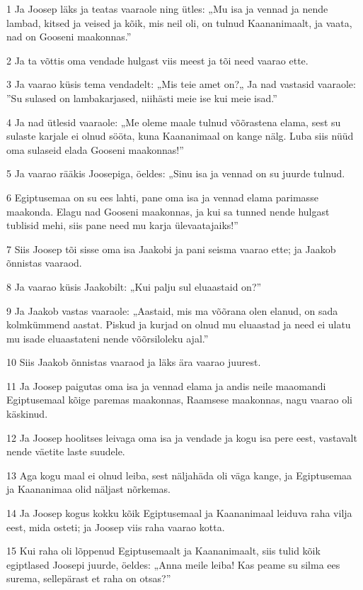 \par 1 Ja Joosep läks ja teatas vaaraole ning ütles: „Mu isa ja vennad ja nende lambad, kitsed ja veised ja kõik, mis neil oli, on tulnud Kaananimaalt, ja vaata, nad on Gooseni maakonnas.”
\par 2 Ja ta võttis oma vendade hulgast viis meest ja tõi need vaarao ette.
\par 3 Ja vaarao küsis tema vendadelt: „Mis teie amet on?„ Ja nad vastasid vaaraole: ”Su sulased on lambakarjased, niihästi meie ise kui meie isad.”
\par 4 Ja nad ütlesid vaaraole: „Me oleme maale tulnud võõrastena elama, sest su sulaste karjale ei olnud sööta, kuna Kaananimaal on kange nälg. Luba siis nüüd oma sulaseid elada Gooseni maakonnas!”
\par 5 Ja vaarao rääkis Joosepiga, öeldes: „Sinu isa ja vennad on su juurde tulnud.
\par 6 Egiptusemaa on su ees lahti, pane oma isa ja vennad elama parimasse maakonda. Elagu nad Gooseni maakonnas, ja kui sa tunned nende hulgast tublisid mehi, siis pane need mu karja ülevaatajaiks!”
\par 7 Siis Joosep tõi sisse oma isa Jaakobi ja pani seisma vaarao ette; ja Jaakob õnnistas vaaraod.
\par 8 Ja vaarao küsis Jaakobilt: „Kui palju sul eluaastaid on?”
\par 9 Ja Jaakob vastas vaaraole: „Aastaid, mis ma võõrana olen elanud, on sada kolmkümmend aastat. Piskud ja kurjad on olnud mu eluaastad ja need ei ulatu mu isade eluaastateni nende võõrsiloleku ajal.”
\par 10 Siis Jaakob õnnistas vaaraod ja läks ära vaarao juurest.
\par 11 Ja Joosep paigutas oma isa ja vennad elama ja andis neile maaomandi Egiptusemaal kõige paremas maakonnas, Raamsese maakonnas, nagu vaarao oli käskinud.
\par 12 Ja Joosep hoolitses leivaga oma isa ja vendade ja kogu isa pere eest, vastavalt nende väetite laste suudele.
\par 13 Aga kogu maal ei olnud leiba, sest näljahäda oli väga kange, ja Egiptusemaa ja Kaananimaa olid näljast nõrkemas.
\par 14 Ja Joosep kogus kokku kõik Egiptusemaal ja Kaananimaal leiduva raha vilja eest, mida osteti; ja Joosep viis raha vaarao kotta.
\par 15 Kui raha oli lõppenud Egiptusemaalt ja Kaananimaalt, siis tulid kõik egiptlased Joosepi juurde, öeldes: „Anna meile leiba! Kas peame su silma ees surema, sellepärast et raha on otsas?”
